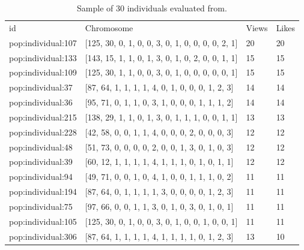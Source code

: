 \begin{table}
\small
\caption{Sample of 30 individuals evaluated from.}
\label{tab:totalIndividuals_1} 
\centering
\small
\begin{tabular}{p{3cm} p{4cm} p{3cm} p{3cm}}
\hline\noalign{\smallskip}
 id & Chromosome & Views & Likes  \\
\noalign{\smallskip}\hline\noalign{\smallskip}
\small{pop:individual:107} & \small{[125, 30, 0, 1, 0, 0, 3, 0, 1, 0, 0, 0, 0, 2, 1]} 
& \small{20} & \small{20}\\ \hline 
\small{pop:individual:133} & \small{[143, 15, 1, 1, 0, 1, 3, 0, 1, 0, 2, 0, 0, 1, 1]} 
& \small{15} & \small{15}\\ \hline 
\small{pop:individual:109} & \small{[125, 30, 1, 1, 0, 0, 3, 0, 1, 0, 0, 0, 0, 0, 1]} 
& \small{15} & \small{15}\\ \hline 
\small{pop:individual:37} & \small{[87, 64, 1, 1, 1, 1, 4, 0, 1, 0, 0, 0, 1, 2, 3]} 
& \small{14} & \small{14}\\ \hline 
\small{pop:individual:36} & \small{[95, 71, 0, 1, 1, 0, 3, 1, 0, 0, 0, 1, 1, 1, 2]} 
& \small{14} & \small{14}\\ \hline 
\small{pop:individual:215} & \small{[138, 29, 1, 1, 0, 1, 3, 0, 1, 1, 1, 0, 0, 1, 1]} 
& \small{13} & \small{13}\\ \hline 
\small{pop:individual:228} & \small{[42, 58, 0, 0, 1, 1, 4, 0, 0, 0, 2, 0, 0, 0, 3]} 
& \small{12} & \small{12}\\ \hline 
\small{pop:individual:48} & \small{[51, 73, 0, 0, 0, 0, 2, 0, 0, 1, 3, 0, 1, 0, 3]} 
& \small{12} & \small{12}\\ \hline 
\small{pop:individual:39} & \small{[60, 12, 1, 1, 1, 1, 4, 1, 1, 1, 0, 1, 0, 1, 1]} 
& \small{12} & \small{12}\\ \hline 
\small{pop:individual:94} & \small{[49, 71, 0, 0, 1, 0, 4, 1, 0, 0, 1, 1, 1, 0, 2]} 
& \small{11} & \small{11}\\ \hline 
\small{pop:individual:194} & \small{[87, 64, 0, 1, 1, 1, 1, 3, 0, 0, 0, 0, 1, 2, 3]} 
& \small{11} & \small{11}\\ \hline 
\small{pop:individual:75} & \small{[97, 66, 0, 0, 1, 1, 3, 0, 1, 0, 3, 0, 1, 0, 1]} 
& \small{11} & \small{11}\\ \hline 
\small{pop:individual:105} & \small{[125, 30, 0, 1, 0, 0, 3, 0, 1, 0, 0, 1, 0, 0, 1]} 
& \small{11} & \small{11}\\ \hline 
\small{pop:individual:306} & \small{[87, 64, 1, 1, 1, 1, 4, 1, 1, 1, 1, 0, 1, 2, 3]} 
& \small{13} & \small{10}\\ \hline 

\end{tabular}
\end{table}
